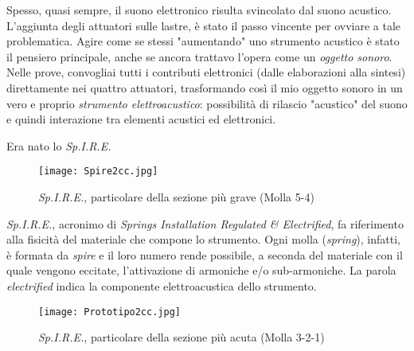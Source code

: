 Spesso, quasi sempre, il suono elettronico risulta svincolato dal suono acustico. L'aggiunta degli attuatori sulle lastre, è stato il passo vincente per ovviare a tale problematica. Agire come se stessi "aumentando" uno strumento acustico è stato il pensiero principale, anche se ancora trattavo l'opera come un \textit{oggetto sonoro}. Nelle prove, convogliai tutti i contributi elettronici (dalle elaborazioni alla sintesi) direttamente nei quattro attuatori,  trasformando così il mio oggetto sonoro in un vero e proprio \textit{strumento elettroacustico}: possibilità di rilascio "acustico" del suono e quindi interazione tra elementi acustici ed elettronici. 

Era nato lo \textit{Sp.I.R.E.}


\begin{figure}[htbp]
\begin{center}
\texttt{[image: Spire2cc.jpg]}
\caption{\textit{Sp.I.R.E.}, particolare della sezione più grave (Molla 5-4)}
\label{default}
\end{center}
\end{figure}

\textit{Sp.I.R.E.}, acronimo di \textit{Springs Installation Regulated \& Electrified}, fa riferimento alla fisicità del materiale che compone lo strumento. Ogni molla (\textit{spring}), infatti, è formata da \textit{spire} e il loro numero rende possibile, a seconda del materiale con il quale vengono eccitate, l'attivazione di armoniche e/o sub-armoniche. La parola \textit{electrified} indica la componente elettroacustica dello strumento.


\begin{figure}[htbp]
\begin{center}
\texttt{[image: Prototipo2cc.jpg]}
\caption{\textit{Sp.I.R.E.}, particolare della sezione più acuta (Molla 3-2-1)}
\label{default}
\end{center}
\end{figure}

